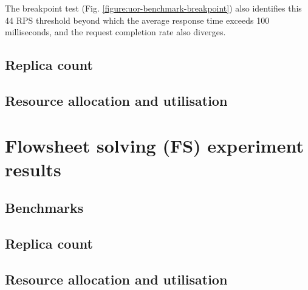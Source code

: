 The breakpoint test (Fig. \ref{figure:uor-benchmark-breakpoint}) also identifies this 44 RPS threshold beyond which the average response time exceeds 100 milliseconds, and the request completion rate also diverges.


\subsection{Replica count}


\subsection{Resource allocation and utilisation}



\section{Flowsheet solving (FS) experiment results}

\subsection{Benchmarks}


\subsection{Replica count}


\subsection{Resource allocation and utilisation}


